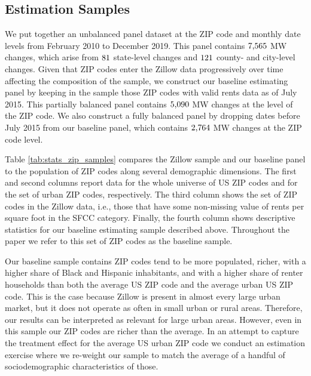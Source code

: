 \subsection{Estimation Samples}\label{sec:data_final_panel}

We put together an unbalanced panel dataset at the ZIP code and monthly date 
levels from February 2010 to December 2019.
This panel contains $\textnormal{7,565}$ MW changes, which arise from 
$\textnormal{81}$ state-level changes and $\textnormal{121}$ 
county- and city-level changes.
Given that ZIP codes enter the Zillow data progressively over time affecting 
the composition of the sample,
we construct our baseline estimating panel by keeping in the sample those ZIP 
codes with valid rents data as of July 2015.
This partially balanced panel contains $\textnormal{5,090}$ MW changes
at the level of the ZIP code.
We also construct a fully balanced panel by dropping dates before July 2015 
from our baseline panel, which contains $\textnormal{2,764}$ MW changes at the 
ZIP code level.

Table \ref{tab:stats_zip_samples} compares the Zillow sample and our baseline 
panel to the population of ZIP codes along several demographic dimensions. 
The first and second columns report data for the whole universe of US ZIP codes 
and for the set of urban ZIP codes, respectively.
The third column shows the set of ZIP codes in the Zillow data, i.e., those 
that have some non-missing value of rents per square foot in the SFCC category.
Finally, the fourth column shows descriptive statistics for our baseline 
estimating sample described above.
Throughout the paper we refer to this set of ZIP codes as the baseline sample.

Our baseline sample contains ZIP codes tend to be more populated, richer, 
with a higher share of Black and Hispanic inhabitants, and with a higher share 
of renter households than both 
the average US ZIP code and the average urban US ZIP code.
This is the case because Zillow is present in almost every large urban market, 
but it does not operate as often in small urban or rural areas.
Therefore, our results can be interpreted as relevant for large urban areas.
However, even in this sample our ZIP codes are richer than the average.
In an attempt to capture the treatment effect for the average US urban ZIP code 
we conduct an estimation exercise where we re-weight our sample to match the 
average of a handful of sociodemographic characteristics of those.

